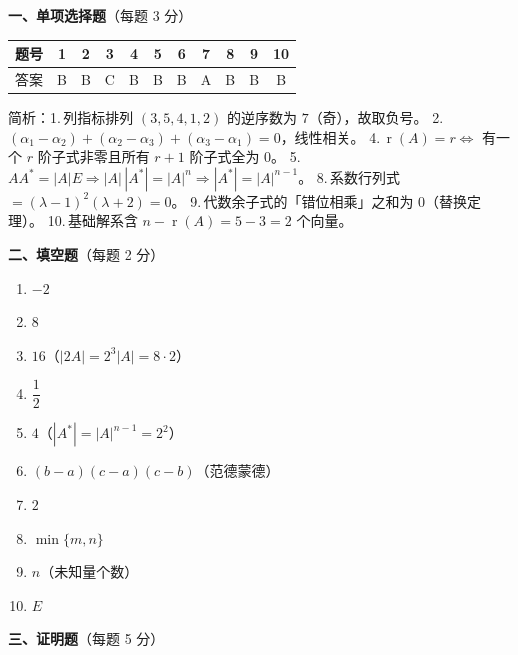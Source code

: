 \documentclass[12pt]{ctexart}
\newcommand{\rank}{\operatorname{r}}
\begin{document}
\noindent\textbf{一、单项选择题}（每题 3 分）\par\vspace{4pt}
\begin{center}
\renewcommand{\arraystretch}{1.3}
\begin{tabular}{|c|c|c|c|c|c|c|c|c|c|c|}
\hline
题号 & 1 & 2 & 3 & 4 & 5 & 6 & 7 & 8 & 9 & 10 \\\hline
答案 & B & B & C & B & B & B & A & B & B & B \\\hline
\end{tabular}
\end{center}
\noindent\small 简析：1.\,列指标排列 $(3,5,4,1,2)$ 的逆序数为 $7$（奇），故取负号。
2.\,$(\alpha_1-\alpha_2)+(\alpha_2-\alpha_3)+(\alpha_3-\alpha_1)=0$，线性相关。
4.\,$\rank(A)=r\Leftrightarrow$ 有一个 $r$ 阶子式非零且所有 $r+1$ 阶子式全为 $0$。
5.\,$AA^{*}=|A|E\Rightarrow |A|\,|A^{*}|=|A|^{n}\Rightarrow|A^{*}|=|A|^{n-1}$。
8.\,系数行列式 $=(\lambda-1)^{2}(\lambda+2)=0$。
9.\,代数余子式的「错位相乘」之和为 $0$（替换定理）。
10.\,基础解系含 $n-\rank(A)=5-3=2$ 个向量。\normalsize

\vspace{10pt}
\noindent\textbf{二、填空题}（每题 2 分）\par\vspace{4pt}
\begin{enumerate}[label=\arabic*.,itemsep=3pt]
\item $-2$ \hfill
\item $8$ \hfill
\item $16$（$|2A|=2^{3}|A|=8\cdot2$）\hfill
\item $\dfrac12$ \hfill
\item $4$（$|A^{*}|=|A|^{n-1}=2^{2}$）
\item $(b-a)(c-a)(c-b)$（范德蒙德）
\item $2$ \hfill
\item $\min\{m,n\}$ \hfill
\item $n$（未知量个数）\hfill
\item $E$
\end{enumerate}

\vspace{6pt}
\noindent\textbf{三、证明题}（每题 5 分）
\end{document}
